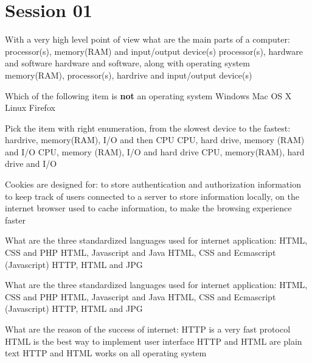 \section{Session 01}

\begin{question}{
With a very high level point of view what are the main parts of a computer:}
  \true processor(s), memory(RAM) and input/output device(s)
  \false processor(s), hardware and software
  \false hardware and software, along with operating system
  \false memory(RAM), processor(s), hardrive and input/output device(s)
\end{question}

\begin{question}{Which of the following item is \textbf{not} an operating system}
  \false Windows
  \false Mac OS X
  \false Linux
  \true Firefox
\end{question}

\begin{question}{Pick the item with right enumeration, from the slowest device to the fastest:}
  \false hardrive, memory(RAM), I/O and then CPU
  \false CPU, hard drive, memory (RAM) and I/O
  \false CPU, memory (RAM), I/O and hard drive
  \true CPU, memory(RAM), hard drive and I/O
\end{question}

\begin{question}{Cookies are designed for:}
  \false to store authentication and authorization information
  \false to keep track of users connected to a server
  \true to store information locally, on the internet browser used
  \false to cache information, to make the browsing experience faster
\end{question}

\begin{question}{What are the three standardized languages used for internet application:}
  \false HTML, CSS and PHP
  \false HTML, Javascript and Java
  \true HTML, CSS and Ecmascript (Javascript)
  \false HTTP, HTML and JPG
\end{question}

\begin{question}{What are the three standardized languages used for internet application:}
  \false HTML, CSS and PHP
  \false HTML, Javascript and Java
  \true HTML, CSS and Ecmascript (Javascript)
  \false HTTP, HTML and JPG
\end{question}

\begin{question}{What are the reason of the success of internet:}
  \false HTTP is a very fast protocol
  \false HTML is the best way to implement user interface
  \true HTTP and HTML are plain text
  \true HTTP and HTML works on all operating system
\end{question}

